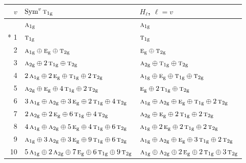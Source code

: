\documentclass[10pt,a4paper]{article}
\numberwithin{equation}{section}
\newcommand{\irr}[1]{\text{\normalfont\scshape #1}}
\newcommand{\ptag}[1]{\mathrm{#1}}
\begin{document}
{\small\begin{longtable}{@{}rll@{}}\toprule
$v$ & $\operatorname{Sym}^{v}\irr{t}_{1\ptag{g}}$ & $H_\ell$, $\ell = v$\\\midrule\endhead
\bottomrule\endfoot\endlastfoot
0 & $\irr{a}_{1\ptag{g}}$ & $\irr{a}_{1\ptag{g}}$\\*
1 & $\irr{t}_{1\ptag{g}}$ & $\irr{t}_{1\ptag{g}}$\\
2 & $\irr{a}_{1\ptag{g}} \oplus \irr{e}_{\ptag{g}} \oplus \irr{t}_{2\ptag{g}}$ & $\irr{e}_{\ptag{g}} \oplus \irr{t}_{2\ptag{g}}$\\
3 & $\irr{a}_{2\ptag{g}} \oplus 2\,\irr{t}_{1\ptag{g}} \oplus \irr{t}_{2\ptag{g}}$ & $\irr{a}_{2\ptag{g}} \oplus \irr{t}_{1\ptag{g}} \oplus \irr{t}_{2\ptag{g}}$\\
4 & $2\,\irr{a}_{1\ptag{g}} \oplus 2\,\irr{e}_{\ptag{g}} \oplus \irr{t}_{1\ptag{g}} \oplus 2\,\irr{t}_{2\ptag{g}}$ & $\irr{a}_{1\ptag{g}} \oplus \irr{e}_{\ptag{g}} \oplus \irr{t}_{1\ptag{g}} \oplus \irr{t}_{2\ptag{g}}$\\
5 & $\irr{a}_{2\ptag{g}} \oplus \irr{e}_{\ptag{g}} \oplus 4\,\irr{t}_{1\ptag{g}} \oplus 2\,\irr{t}_{2\ptag{g}}$ & $\irr{e}_{\ptag{g}} \oplus 2\,\irr{t}_{1\ptag{g}} \oplus \irr{t}_{2\ptag{g}}$\\
6 & $3\,\irr{a}_{1\ptag{g}} \oplus \irr{a}_{2\ptag{g}} \oplus 3\,\irr{e}_{\ptag{g}} \oplus 2\,\irr{t}_{1\ptag{g}} \oplus 4\,\irr{t}_{2\ptag{g}}$ & $\irr{a}_{1\ptag{g}} \oplus \irr{a}_{2\ptag{g}} \oplus \irr{e}_{\ptag{g}} \oplus \irr{t}_{1\ptag{g}} \oplus 2\,\irr{t}_{2\ptag{g}}$\\
7 & $2\,\irr{a}_{2\ptag{g}} \oplus 2\,\irr{e}_{\ptag{g}} \oplus 6\,\irr{t}_{1\ptag{g}} \oplus 4\,\irr{t}_{2\ptag{g}}$ & $\irr{a}_{2\ptag{g}} \oplus \irr{e}_{\ptag{g}} \oplus 2\,\irr{t}_{1\ptag{g}} \oplus 2\,\irr{t}_{2\ptag{g}}$\\
8 & $4\,\irr{a}_{1\ptag{g}} \oplus \irr{a}_{2\ptag{g}} \oplus 5\,\irr{e}_{\ptag{g}} \oplus 4\,\irr{t}_{1\ptag{g}} \oplus 6\,\irr{t}_{2\ptag{g}}$ & $\irr{a}_{1\ptag{g}} \oplus 2\,\irr{e}_{\ptag{g}} \oplus 2\,\irr{t}_{1\ptag{g}} \oplus 2\,\irr{t}_{2\ptag{g}}$\\
9 & $\irr{a}_{1\ptag{g}} \oplus 3\,\irr{a}_{2\ptag{g}} \oplus 3\,\irr{e}_{\ptag{g}} \oplus 9\,\irr{t}_{1\ptag{g}} \oplus 6\,\irr{t}_{2\ptag{g}}$ & $\irr{a}_{1\ptag{g}} \oplus \irr{a}_{2\ptag{g}} \oplus \irr{e}_{\ptag{g}} \oplus 3\,\irr{t}_{1\ptag{g}} \oplus 2\,\irr{t}_{2\ptag{g}}$\\
10 & $5\,\irr{a}_{1\ptag{g}} \oplus 2\,\irr{a}_{2\ptag{g}} \oplus 7\,\irr{e}_{\ptag{g}} \oplus 6\,\irr{t}_{1\ptag{g}} \oplus 9\,\irr{t}_{2\ptag{g}}$ & $\irr{a}_{1\ptag{g}} \oplus \irr{a}_{2\ptag{g}} \oplus 2\,\irr{e}_{\ptag{g}} \oplus 2\,\irr{t}_{1\ptag{g}} \oplus 3\,\irr{t}_{2\ptag{g}}$\\

\end{longtable}}
\end{document}
